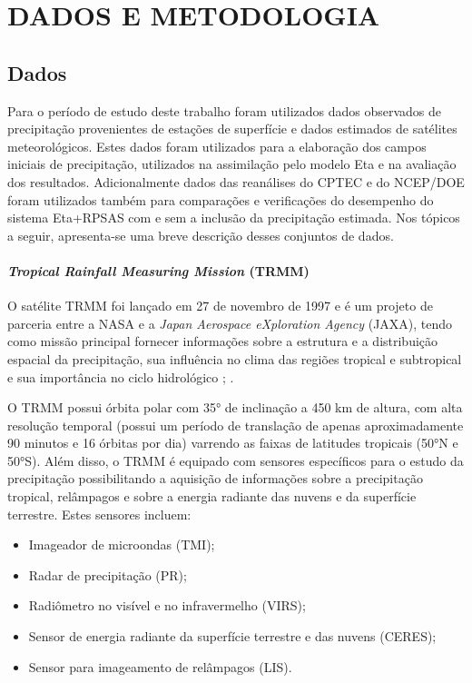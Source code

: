 \hypertarget{estilo:capitulo}{}
\chapter{DADOS E METODOLOGIA}
\label{ss:cap2}

\section{Dados}
\label{ss:dados}
    
Para o período de estudo deste trabalho foram utilizados dados observados de precipitação provenientes de estações de superfície e dados estimados de satélites meteorológicos. Estes dados foram utilizados para a elaboração dos campos iniciais de precipitação, utilizados na assimilação pelo modelo Eta e na avaliação dos resultados. Adicionalmente dados das reanálises do CPTEC e do NCEP/DOE foram utilizados também para comparações e verificações do desempenho do sistema Eta+RPSAS com e sem a inclusão da precipitação estimada. Nos tópicos a seguir, apresenta-se uma breve descrição desses conjuntos de dados.

\subsubsection{\textit{Tropical Rainfall Measuring Mission} (TRMM)}

O satélite TRMM foi lançado em 27 de novembro de 1997 e é um projeto de parceria entre a NASA e a \textit{Japan Aerospace eXploration Agency} (JAXA), tendo como missão principal  fornecer informações sobre a estrutura e a distribuição espacial da precipitação, sua influência no clima das regiões tropical e subtropical e sua importância no ciclo hidrológico \cite{simpsonetal88}; \cite{simpsonetal96}.

O TRMM possui órbita polar com 35° de inclinação a 450 km de altura, com alta resolução temporal (possui um período de translação de apenas aproximadamente 90 minutos e 16 órbitas por dia) varrendo as faixas de latitudes tropicais (50°N e 50°S). Além disso, o TRMM é equipado com sensores específicos para o estudo da precipitação possibilitando a aquisição de informações sobre a precipitação tropical, relâmpagos e sobre a energia radiante das nuvens e da superfície terrestre. Estes sensores incluem:

\begin{itemize}
\item Imageador de microondas (TMI);
\item Radar de precipitação (PR);
\item Radiômetro no visível e no infravermelho (VIRS);
\item Sensor de energia radiante da superfície terrestre e das nuvens (CERES);
\item Sensor para imageamento de relâmpagos (LIS).
\end{itemize}

